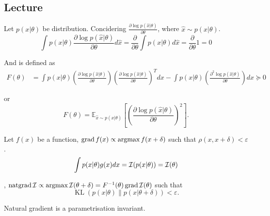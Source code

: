 \subsection{Lecture}

\begin{edefn}
    Let $p(x \vert \theta)$ be distribution. Concidering $\frac{\partial \log p(\hat{x} | \theta)}{\partial \theta}$, where $\hat{x} \sim p(x | \theta)$. 
    \begin{equation*}
        \int p(x | \theta) \frac{\partial \log p(\hat{x} | \theta)}{\partial \theta} d\hat{x} = \frac{\partial}{\partial \theta} \int p(x | \theta) d\hat{x} = \frac{\partial}{\partial \theta} 1 = 0
    \end{equation*}

    And  is defined as
    \begin{equation*}
        \begin{aligned}
            F(\theta) &= \int p(x | \theta) \left( \frac{\partial \log p(\hat{x} | \theta)}{\partial \theta} \right) \left( \frac{\partial \log p(\hat{x} | \theta)}{\partial \theta} \right)^T dx -\int p(x | \theta) \left( \frac{\partial^2 \log p(\hat{x} | \theta)}{\partial \theta} \right) dx \succeq 0
        \end{aligned}
    \end{equation*}

    or
    \begin{equation*}
        F(\theta) = \mathbb{E}_{\hat{x} \sim p(x | \theta)} \left[ \left( \frac{\partial \log p(\hat{x} | \theta)}{\partial \theta} \right)^2 \right].
    \end{equation*}
\end{edefn}

Let $f(x)$ be a function, $\operatorname{grad} f(x) \propto \operatorname{argmax} f(x + \delta)$ such that $\rho(x, x+ \delta) < \varepsilon$.  $$\int p(x | \theta) g(x) dx = \operatorname{\mathcal{I}}(p(x | \theta)) = \operatorname{\mathcal{I}}(\theta)$$

\begin{edefn}
    , $\operatorname{natgrad} \operatorname{\mathcal{I}} \propto \operatorname{argmax} \operatorname{\mathcal{I}}(\theta + \delta) = F^{-1}(\theta) \operatorname{grad} \operatorname{\mathcal{I}} (\theta)$ such that $$\operatorname{KL} \left( p(x | \theta) \parallel p(x | \theta + \delta)\right) < \varepsilon.$$  
\end{edefn}

\begin{eremark}
    Natural gradient is a parametrisation invariant.
\end{eremark}

